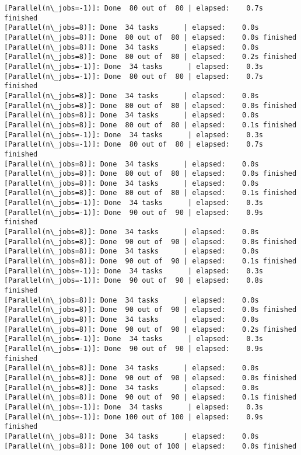 \documentclass[11pt]{article}
\begin{document}
\begin{Verbatim}[commandchars=\\\{\}]
[Parallel(n\_jobs=-1)]: Done  80 out of  80 | elapsed:    0.7s finished
[Parallel(n\_jobs=8)]: Done  34 tasks      | elapsed:    0.0s
[Parallel(n\_jobs=8)]: Done  80 out of  80 | elapsed:    0.0s finished
[Parallel(n\_jobs=8)]: Done  34 tasks      | elapsed:    0.0s
[Parallel(n\_jobs=8)]: Done  80 out of  80 | elapsed:    0.2s finished
[Parallel(n\_jobs=-1)]: Done  34 tasks      | elapsed:    0.3s
[Parallel(n\_jobs=-1)]: Done  80 out of  80 | elapsed:    0.7s finished
[Parallel(n\_jobs=8)]: Done  34 tasks      | elapsed:    0.0s
[Parallel(n\_jobs=8)]: Done  80 out of  80 | elapsed:    0.0s finished
[Parallel(n\_jobs=8)]: Done  34 tasks      | elapsed:    0.0s
[Parallel(n\_jobs=8)]: Done  80 out of  80 | elapsed:    0.1s finished
[Parallel(n\_jobs=-1)]: Done  34 tasks      | elapsed:    0.3s
[Parallel(n\_jobs=-1)]: Done  80 out of  80 | elapsed:    0.7s finished
[Parallel(n\_jobs=8)]: Done  34 tasks      | elapsed:    0.0s
[Parallel(n\_jobs=8)]: Done  80 out of  80 | elapsed:    0.0s finished
[Parallel(n\_jobs=8)]: Done  34 tasks      | elapsed:    0.0s
[Parallel(n\_jobs=8)]: Done  80 out of  80 | elapsed:    0.1s finished
[Parallel(n\_jobs=-1)]: Done  34 tasks      | elapsed:    0.3s
[Parallel(n\_jobs=-1)]: Done  90 out of  90 | elapsed:    0.9s finished
[Parallel(n\_jobs=8)]: Done  34 tasks      | elapsed:    0.0s
[Parallel(n\_jobs=8)]: Done  90 out of  90 | elapsed:    0.0s finished
[Parallel(n\_jobs=8)]: Done  34 tasks      | elapsed:    0.0s
[Parallel(n\_jobs=8)]: Done  90 out of  90 | elapsed:    0.1s finished
[Parallel(n\_jobs=-1)]: Done  34 tasks      | elapsed:    0.3s
[Parallel(n\_jobs=-1)]: Done  90 out of  90 | elapsed:    0.8s finished
[Parallel(n\_jobs=8)]: Done  34 tasks      | elapsed:    0.0s
[Parallel(n\_jobs=8)]: Done  90 out of  90 | elapsed:    0.0s finished
[Parallel(n\_jobs=8)]: Done  34 tasks      | elapsed:    0.0s
[Parallel(n\_jobs=8)]: Done  90 out of  90 | elapsed:    0.2s finished
[Parallel(n\_jobs=-1)]: Done  34 tasks      | elapsed:    0.3s
[Parallel(n\_jobs=-1)]: Done  90 out of  90 | elapsed:    0.9s finished
[Parallel(n\_jobs=8)]: Done  34 tasks      | elapsed:    0.0s
[Parallel(n\_jobs=8)]: Done  90 out of  90 | elapsed:    0.0s finished
[Parallel(n\_jobs=8)]: Done  34 tasks      | elapsed:    0.0s
[Parallel(n\_jobs=8)]: Done  90 out of  90 | elapsed:    0.1s finished
[Parallel(n\_jobs=-1)]: Done  34 tasks      | elapsed:    0.3s
[Parallel(n\_jobs=-1)]: Done 100 out of 100 | elapsed:    0.9s finished
[Parallel(n\_jobs=8)]: Done  34 tasks      | elapsed:    0.0s
[Parallel(n\_jobs=8)]: Done 100 out of 100 | elapsed:    0.0s finished

\end{Verbatim}
\end{document}

